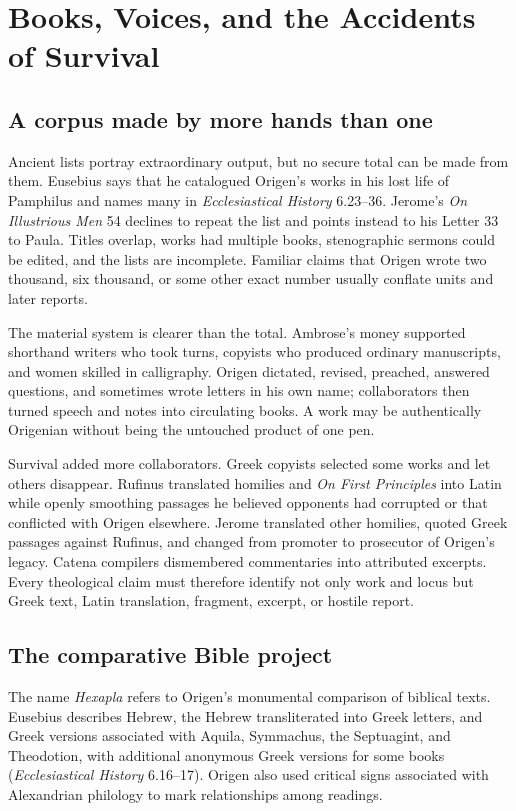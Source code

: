 \section{Books, Voices, and the Accidents of Survival}
\label{sec:origen-books}

\subsection{A corpus made by more hands than one}

Ancient lists portray extraordinary output, but no secure total can be made
from them. Eusebius says that he catalogued Origen's works in his lost life of
Pamphilus and names many in \emph{Ecclesiastical History} 6.23--36. Jerome's
\emph{On Illustrious Men} 54 declines to repeat the list and points instead to
his Letter 33 to Paula. Titles overlap, works had multiple books, stenographic
sermons could be edited, and the lists are incomplete. Familiar
claims that Origen wrote two thousand, six thousand, or some other exact number
usually conflate units and later reports.

The material system is clearer than the total. Ambrose's money supported
shorthand writers who took turns, copyists who produced ordinary manuscripts,
and women skilled in calligraphy. Origen dictated, revised, preached, answered
questions, and sometimes wrote letters in his own name; collaborators then
turned speech and notes into circulating books. A work may be authentically
Origenian without being the untouched product of one pen.

Survival added more collaborators. Greek copyists selected some works and let
others disappear. Rufinus translated homilies and \emph{On First Principles}
into Latin while openly smoothing passages he believed opponents had corrupted
or that conflicted with Origen elsewhere. Jerome translated other homilies,
quoted Greek passages against Rufinus, and changed from promoter to prosecutor
of Origen's legacy. Catena compilers dismembered commentaries into attributed
excerpts. Every theological claim must therefore identify not only work and
locus but Greek text, Latin translation, fragment, excerpt, or hostile report.

\subsection{The comparative Bible project}

The name \emph{Hexapla} refers to Origen's monumental comparison of biblical
texts. Eusebius describes Hebrew, the Hebrew transliterated into Greek letters,
and Greek versions associated with Aquila, Symmachus, the Septuagint, and
Theodotion, with additional anonymous Greek versions for some books
(\emph{Ecclesiastical History} 6.16--17). Origen also used critical signs
associated with Alexandrian philology to mark relationships among readings.

